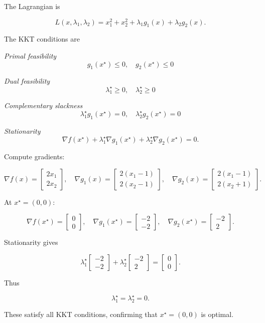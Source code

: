 \documentclass[
	12pt,
]{fphw}
\begin{document}
\begin{enumerate}
The Lagrangian is

\[
L(x,\lambda_1,\lambda_2)
=
x_1^2+x_2^2
+
\lambda_1 g_1(x)
+
\lambda_2 g_2(x).
\]

The KKT conditions are

\textit{Primal feasibility}
\[
g_1(x^\star)\le0,\quad g_2(x^\star)\le0
\]

\textit{Dual feasibility}
\[
\lambda_1^\star\ge0,\quad \lambda_2^\star\ge0
\]

\textit{Complementary slackness}
\[
\lambda_1^\star g_1(x^\star)=0,
\quad
\lambda_2^\star g_2(x^\star)=0
\]

\textit{Stationarity}
\[
\nabla f(x^\star)
+
\lambda_1^\star \nabla g_1(x^\star)
+
\lambda_2^\star \nabla g_2(x^\star)
=0.
\]

Compute gradients:

\[
\nabla f(x)=
\begin{bmatrix}
2x_1\\
2x_2
\end{bmatrix},
\quad
\nabla g_1(x)=
\begin{bmatrix}
2(x_1-1)\\
2(x_2-1)
\end{bmatrix},
\quad
\nabla g_2(x)=
\begin{bmatrix}
2(x_1-1)\\
2(x_2+1)
\end{bmatrix}.
\]

At $x^\star=(0,0)$:

\[
\nabla f(x^\star)=
\begin{bmatrix}
0\\
0
\end{bmatrix},
\quad
\nabla g_1(x^\star)=
\begin{bmatrix}
-2\\
-2
\end{bmatrix},
\quad
\nabla g_2(x^\star)=
\begin{bmatrix}
-2\\
2
\end{bmatrix}.
\]

Stationarity gives

\[
\lambda_1^\star
\begin{bmatrix}
-2\\
-2
\end{bmatrix}
+
\lambda_2^\star
\begin{bmatrix}
-2\\
2
\end{bmatrix}
=
\begin{bmatrix}
0\\
0
\end{bmatrix}.
\]

Thus

\[
\lambda_1^\star=\lambda_2^\star=0.
\]

These satisfy all KKT conditions, confirming that $x^\star=(0,0)$ is optimal.
\end{enumerate}
\end{document}
